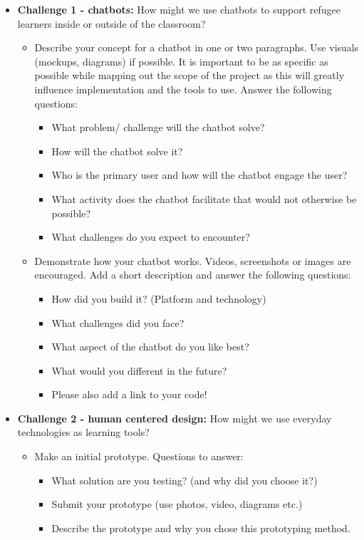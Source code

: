 \documentclass[12pt,twoside]{mitthesis}
\begin{document}
\begin{itemize}
\item \textbf{Challenge 1 - chatbots:} How might we use chatbots to support refugee learners inside or outside of the classroom? 
\begin{itemize}
\item Describe your concept for a chatbot in one or two paragraphs. Use visuals (mockups, diagrams) if possible. It is important to be as specific as possible while mapping out the scope of the project as this will greatly influence implementation and the tools to use. Answer the following questions:
\begin{itemize}
\item What problem/ challenge will the chatbot solve? 
\item How will the chatbot solve it? 
\item Who is the primary user and how will the chatbot engage the user?
\item What activity does the chatbot facilitate that would not otherwise be possible? 
\item What challenges do you expect to encounter?
\end{itemize}
\item Demonstrate how your chatbot works. Videos, screenshots or images are encouraged. Add a short description and answer the following questions: 
\begin{itemize}
\item How did you build it? (Platform and technology)
\item What challenges did you face?
\item What aspect of the chatbot do you like best? 
\item What would you different in the future? 
\item Please also add a link to your code!
\end{itemize}
\end{itemize}
\item \textbf{Challenge 2 - human centered design:} How might we use everyday technologies as learning tools?
\begin{itemize}
\item Make an initial prototype. Questions to answer:
\begin{itemize}
\item What solution are you testing? (and why did you choose it?)
\item Submit your prototype (use photos, video, diagrams etc.)
\item Describe the prototype and why you chose this prototyping method. 

\end{itemize}
\end{itemize}
\end{itemize}
\end{document}
